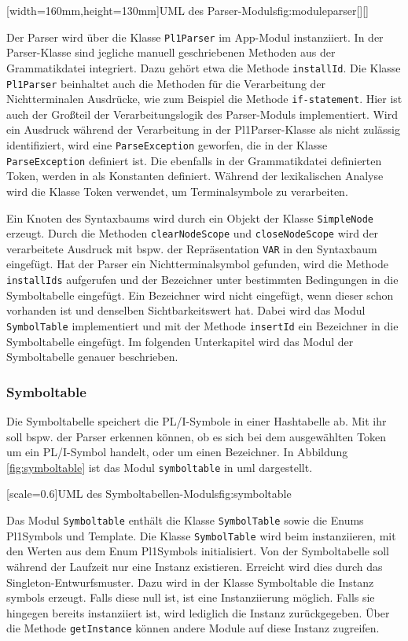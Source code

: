 [width=160mm,height=130mm]{UML des Parser-Moduls}{fig:moduleparser}[][]
\pagebreak

Der Parser wird über die Klasse \verb+Pl1Parser+ im App-Modul instanziiert. In der Parser-Klasse sind jegliche manuell geschriebenen Methoden aus der Grammatikdatei integriert. 
Dazu gehört etwa die Methode \verb+installId+. Die Klasse \verb+Pl1Parser+  beinhaltet auch die Methoden für die Verarbeitung der Nichtterminalen Ausdrücke, wie zum Beispiel die Methode \verb+if-statement+. Hier ist auch der Großteil der Verarbeitungslogik des Parser-Moduls implementiert. Wird ein Ausdruck während der Verarbeitung in der Pl1Parser-Klasse als nicht zulässig  identifiziert, wird eine \verb+ParseException+ geworfen, die in der Klasse \verb+ParseException+ definiert ist. Die ebenfalls in der Grammatikdatei definierten Token, werden in  als Konstanten definiert. Während der lexikalischen Analyse wird die Klasse Token verwendet, um Terminalsymbole zu verarbeiten.

Ein Knoten des Syntaxbaums wird durch ein Objekt der Klasse \verb+SimpleNode+ erzeugt. Durch die Methoden \verb+clearNodeScope+ und \verb+closeNodeScope+ wird der verarbeitete Ausdruck mit bspw. der Repräsentation \verb+VAR+ in den Syntaxbaum eingefügt. Hat der Parser ein Nichtterminalsymbol gefunden, wird die Methode \verb+installIds+ aufgerufen und der Bezeichner unter bestimmten Bedingungen in die Symboltabelle eingefügt. Ein Bezeichner wird nicht eingefügt, wenn dieser schon vorhanden ist und denselben Sichtbarkeitswert hat. Dabei wird das Modul \verb+SymbolTable+ implementiert und mit der Methode \verb+insertId+ ein Bezeichner in die Symboltabelle eingefügt. Im folgenden Unterkapitel wird das Modul der Symboltabelle genauer beschrieben. 

\subsubsection{Symboltable}
Die Symboltabelle speichert die PL/I-Symbole in einer Hashtabelle ab. Mit ihr soll bspw. der Parser
erkennen können, ob es sich bei dem ausgewählten Token um ein PL/I-Symbol handelt, oder um einen Bezeichner.
In Abbildung \ref{fig:symboltable} ist das Modul \verb+symboltable+ in \ac{uml} dargestellt.

[scale=0.6]{UML des Symboltabellen-Moduls}{fig:symboltable}

Das Modul \verb+Symboltable+ enthält die Klasse \verb+SymbolTable+ sowie die Enums Pl1Symbols und Template. Die Klasse \verb+SymbolTable+ wird beim instanziieren, mit den Werten aus dem Enum Pl1Symbols initialisiert. Von der Symboltabelle soll während der Laufzeit nur eine Instanz existieren. Erreicht wird dies durch das Singleton-Entwurfsmuster.
Dazu wird in der Klasse Symboltable die Instanz symbols erzeugt. Falls diese null ist, ist eine Instanziierung möglich. Falls sie hingegen bereits instanziiert ist, wird lediglich die Instanz zurückgegeben. Über die Methode \verb+getInstance+ können andere Module auf diese Instanz zugreifen.

